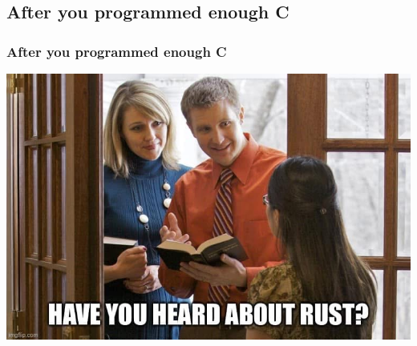 \documentclass[
	11pt, %
]{beamer}
\begin{document}
\begin{frame}
    \subsection{After you programmed enough C}
	\frametitle{After you programmed enough C}

    \centering
    \includegraphics[width=.9\textwidth]{images/linux-jehovas.jpg}

\end{frame}
\end{document}
